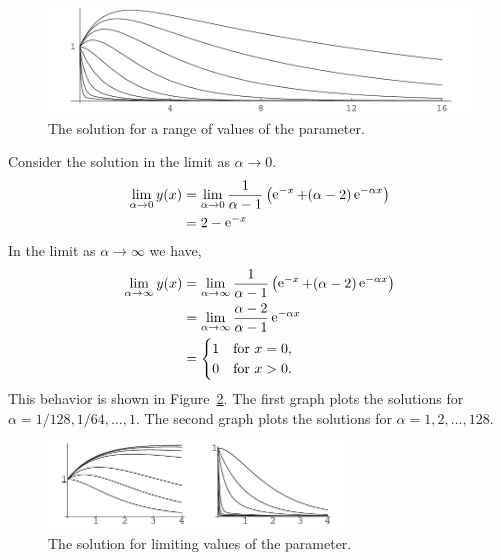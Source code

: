 \begin{Solution}
  \begin{figure}[tb!]
    \begin{center}
      \includegraphics[width=\textwidth]{ode/first_order/range_alpha}
    \end{center}
    \caption{The solution for a range of values of the parameter.}
    \label{figure range alpha}
  \end{figure}

  Consider the solution in the limit as $\alpha \to 0$.
  \begin{align*}
    \lim_{\alpha \to 0} y(x)
    &= \lim_{\alpha \to 0} \frac{1}{\alpha - 1} \left( \mathop{\mathrm{e}}\nolimits^{-x} 
      + (\alpha-2) \mathop{\mathrm{e}}\nolimits^{- \alpha x} \right) \\
    &= 2 - \mathop{\mathrm{e}}\nolimits^{-x}
  \end{align*}
  In the limit as $\alpha \to \infty$ we have,
  \begin{align*}
    \lim_{\alpha \to \infty} y(x)
    &= \lim_{\alpha \to \infty} \frac{1}{\alpha - 1} \left( \mathop{\mathrm{e}}\nolimits^{-x} 
      + (\alpha-2) \mathop{\mathrm{e}}\nolimits^{- \alpha x} \right) \\
    &= \lim_{\alpha \to \infty} \frac{\alpha-2}{\alpha - 1} 
    \mathop{\mathrm{e}}\nolimits^{- \alpha x} \\
    &= \begin{cases}
      1 & \mathrm{for}\ x = 0, \\
      0 & \mathrm{for}\ x > 0.
    \end{cases}
  \end{align*}
  This behavior is shown in Figure~\ref{alpha_0_alpha_inf}.  The first graph
  plots the solutions for $\alpha = 1/128, 1/64, \ldots,1$.
  The second graph plots the solutions for 
  $\alpha = 1,2,\ldots,128$.

  \begin{figure}[tb!]
    \begin{center}
      \includegraphics[width=0.7\textwidth]{ode/first_order/alpha_0_alpha_inf}
    \end{center}
    \caption{The solution for limiting values of the parameter.}
    \label{alpha_0_alpha_inf}
  \end{figure}
\end{Solution}







